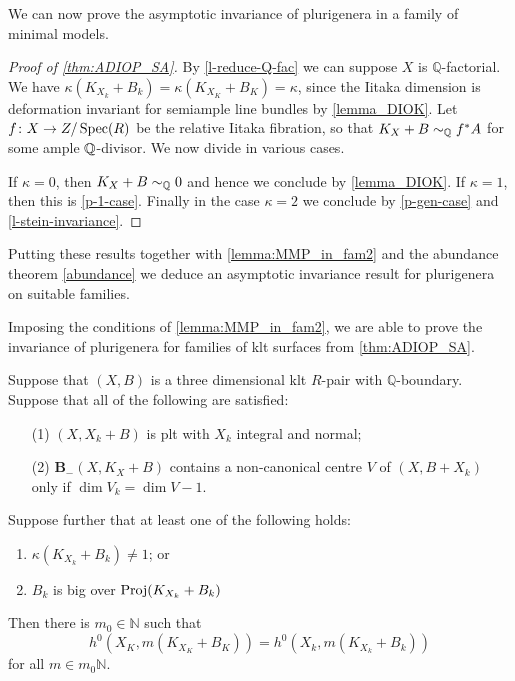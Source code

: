 	
	We can now prove the asymptotic invariance of plurigenera in a family of minimal models.
	
	\begin{proof}[Proof of \autoref{thm:ADIOP_SA}]
		By \autoref{l-reduce-Q-fac} we can suppose $X$ is $\mathbb{Q}$-factorial.
		We have $\kappa(K_{X_k}+B_k)=\kappa(K_{X_K}+B_K)=\kappa$, since the Iitaka dimension is deformation invariant for semiample line bundles by \autoref{lemma_DIOK}. Let $f \colon X\to Z/\operatorname{Spec} (R)$ be the relative Iitaka fibration, so that $K_X+B\sim_{\mathbb{Q}}f^\ast A$ for some ample $\mathbb{Q}$-divisor. 
		We now divide in various cases.
		
		If $\kappa=0$, then $K_X+B\sim_{\mathbb{Q}}0$ and hence we conclude by \autoref{lemma_DIOK}.
		If $\kappa=1$, then this is \autoref{p-1-case}. 
		Finally in the case $\kappa=2$ we conclude by \autoref{p-gen-case} and \autoref{l-stein-invariance}. 	
	\end{proof}
	
	
	Putting these results together with \autoref{lemma:MMP_in_fam2} and the abundance theorem \autoref{abundance} we deduce an asymptotic invariance result for plurigenera on suitable families. 
	

	Imposing the conditions of \autoref{lemma:MMP_in_fam2}, we are able to prove the invariance of plurigenera for families of klt surfaces from \autoref{thm:ADIOP_SA}.
	
	\begin{theorem}\label{thm:ADIOP_final2}
		Suppose that $(X,B)$ is a three dimensional klt $R$-pair with $\mathbb{Q}$-boundary.
		Suppose that all of the following are satisfied:
		
		\begin{enumerate}
			\item[(1)] $(X, X_{k}+B)$ is plt with $X_k$ integral and normal;
			\item[(2)]  ${\mathbf{B}_{-}(X, K_{X}+B)}$ contains a non-canonical centre $V$ of $(X,B+X_{k})$ only if $\dim V_{k}=\dim V -1$.
		\end{enumerate}
		Suppose further that at least one of the following holds:
		\begin{enumerate}
			\item $\kappa(K_{X_{k}}+B_{k}) \neq 1$; or
			\item $B_{k}$ is big over $\textup{Proj}(K_{X_{k}}+B_{k})$
		\end{enumerate}	
		Then there is $m_{0} \in \mathbb{N}$ such that 
		$$h^{0}(X_{K},m(K_{X_{K}}+B_{K}))=h^{0}(X_{k},m(K_{X_{k}}+B_{k}))$$
		for all $m \in m_{0}\mathbb{N}$.
		
	\end{theorem}
	
